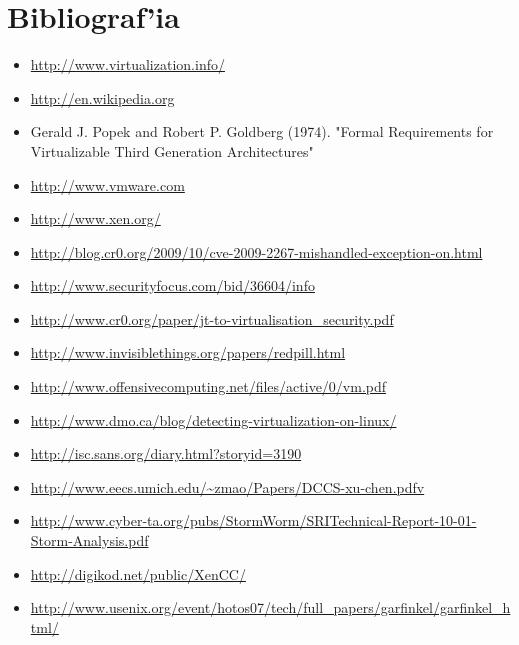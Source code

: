 \section{Bibliograf'ia}

\begin{itemize}
	\item \url{http://www.virtualization.info/}
	\item \url{http://en.wikipedia.org}
	\item Gerald J. Popek and Robert P. Goldberg (1974). "Formal Requirements for Virtualizable Third Generation 
Architectures"
	\item \url{http://www.vmware.com}
	\item \url{http://www.xen.org/}
	\item \url{http://blog.cr0.org/2009/10/cve-2009-2267-mishandled-exception-on.html}
	\item \url{http://www.securityfocus.com/bid/36604/info}
	\item \url{http://www.cr0.org/paper/jt-to-virtualisation_security.pdf}
	\item \url{http://www.invisiblethings.org/papers/redpill.html}
	\item \url{http://www.offensivecomputing.net/files/active/0/vm.pdf}
	\item \url{http://www.dmo.ca/blog/detecting-virtualization-on-linux/}
	\item \url{http://isc.sans.org/diary.html?storyid=3190}
	\item \url{http://www.eecs.umich.edu/~zmao/Papers/DCCS-xu-chen.pdfv}
	\item \url{http://www.cyber-ta.org/pubs/StormWorm/SRITechnical-Report-10-01-Storm-Analysis.pdf}
	\item \url{http://digikod.net/public/XenCC/}
	\item \url{http://www.usenix.org/event/hotos07/tech/full_papers/garfinkel/garfinkel_html/}
\end{itemize}